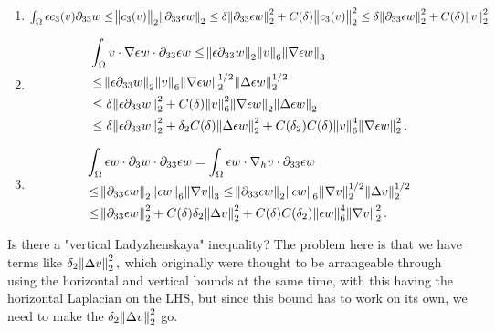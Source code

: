 \documentclass[11pt]{article}
\begin{document}
\begin{enumerate}

\item $\int_\Omega \epsilon c_3(v) \partial_{33} w \leq \norm{c_3(v)}_2 \norm{\partial_{33} \epsilon w}_2 \leq \delta\norm{\partial_{33} \epsilon w}_2^2 + C(\delta) \norm{c_3(v)}_2^2 \leq \delta\norm{\partial_{33} \epsilon w}_2^2 + C(\delta) \norm{v}_2^2$

\item

\begin{equation}
\begin{split}
&\int_\Omega v \cdot \nabla \epsilon w \cdot \partial_{33} \epsilon w \leq \norm{\epsilon \partial_{33}w}_2 \norm{v}_6 \norm{\nabla \epsilon w}_3 \\
& \leq \norm{\epsilon \partial_{33}w}_2 \norm{v}_6 \norm{\nabla \epsilon w}_2^{1/2} \norm{\Delta \epsilon w}_2^{1/2} \\
& \leq \delta \norm{\epsilon \partial_{33}w}_2^2 + C(\delta) \norm{v}_6^2 \norm{\nabla \epsilon w}_2 \norm{\Delta \epsilon w}_2 \\
& \leq \delta \norm{\epsilon \partial_{33}w}_2^2 + \delta_2 C(\delta) \norm{\Delta \epsilon w}_2^2 + C(\delta_2 )C(\delta) \norm{v}_6^4 \norm{\nabla \epsilon w}^2_2.
\end{split}
\end{equation}

\item

\begin{equation}
\begin{split}
& \int_\Omega \epsilon w \cdot \partial_3 w \cdot \partial_{33} \epsilon w = \int_\Omega \epsilon w \cdot \nabla_h v \cdot \partial_{33} \epsilon w \\
& \leq \norm{\partial_{33} \epsilon w}_2 \norm{\epsilon w}_6 \norm{\nabla v}_3  \leq \norm{\partial_{33} \epsilon w}_2 \norm{\epsilon w}_6 \norm{\nabla v}_2^{1/2} \norm{\Delta v}_2^{1/2} \\
& \leq \norm{\partial_{33} \epsilon w}_2^2 + C(\delta) \delta_2 \norm{\Delta v}_2^2 + C(\delta) C(\delta_2) \norm{\epsilon w}_6^4 \norm{\nabla v}_2^2.
\end{split}
\end{equation}

\end{enumerate}

Is there a "vertical Ladyzhenskaya" inequality? The problem here is that we have terms like $\delta_2 \norm{\Delta v}_2^2,$ which originally were thought to be arrangeable through using the horizontal and vertical bounds at the same time, with this having the horizontal Laplacian on the LHS, but since this bound has to work on its own, we need to make the $\delta_2 \norm{\Delta v}_2^2$ go. 
\end{document}
